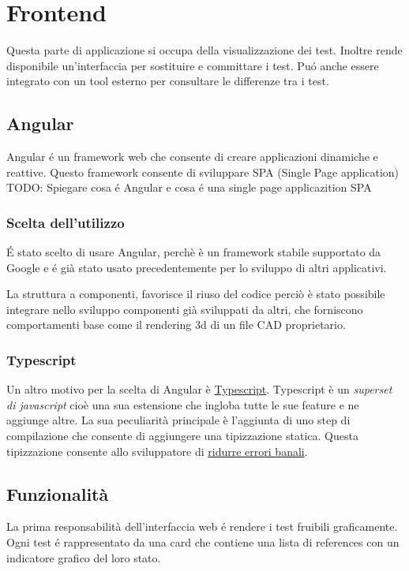 \chapter{Frontend}
    Questa parte di applicazione si occupa della visualizzazione dei test.
    Inoltre rende disponibile un'interfaccia per sostituire e committare i test.
    Pu\'o anche essere integrato con un tool esterno per consultare le differenze tra i test.
    \section{Angular}
        Angular \'e un framework web che consente di creare applicazioni dinamiche e reattive.    
        Questo framework consente di sviluppare SPA (Single Page application)
        TODO: Spiegare cosa \'e Angular e cosa \'e una single page applicazition SPA
        \subsection{Scelta dell'utilizzo}
            \'E stato scelto di usare Angular, perchè è un framework stabile supportato da Google
            e \'e già stato usato precedentemente per lo sviluppo di altri applicativi.
            
            La struttura a componenti, favorisce il riuso del codice perciò è stato possibile integrare
            nello sviluppo componenti già sviluppati da altri, che forniscono comportamenti base
            come il rendering 3d di un file CAD proprietario.
        
        \subsection{Typescript}
            Un altro motivo per la scelta di Angular è \href{https://www.typescriptlang.org}{Typescript}.
            Typescript è un \textit{superset di javascript} cioè una sua estensione che ingloba tutte le sue feature e ne aggiunge altre.
            La sua peculiarità principale è l'aggiunta di uno step di compilazione che consente di aggiungere una tipizzazione statica.
            Questa tipizzazione consente allo sviluppatore di
            \href{https://www.quora.com/Why-is-type-checking-important-in-programming-languages-and-how-should-one-choose-between-dynamically-and-statically-typed-languages}{ridurre errori banali}.
    \section{Funzionalità}
        La prima responsabilità dell'interfaccia web \'e rendere i test fruibili graficamente.
        Ogni test \'e rappresentato da una card che contiene una lista di references con un indicatore grafico del loro stato.
